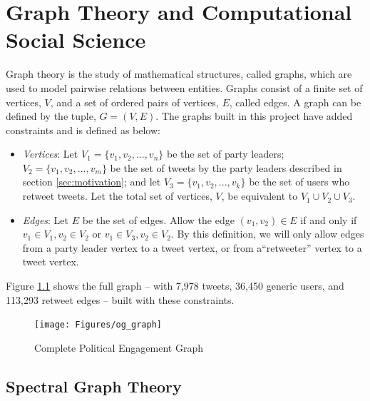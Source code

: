 \chapter{Graph Theory and Computational Social Science}\label{ch:GraphTheory}

Graph theory is the study of mathematical structures, called graphs, which are
used to model pairwise relations between entities. Graphs consist of a finite
set of vertices, $V$, and a set of ordered pairs of vertices, $E$, called edges.
A graph can be defined by the tuple, $G=(V,E)$. The graphs built in this project
have added constraints and is defined as below:

\begin{itemize}
    \item \emph{Vertices}: Let $V_{1}=\{v_{1},v_{2},...,v_{n}\}$ be the set of
    party leaders; $V_{2}=\{v_{1},v_{2},...,v_{m}\}$ be the set of tweets by the
    party leaders described in section \ref{sec:motivation}; and let
    $V_{3}=\{v_{1},v_{2},...,v_{k}\}$ be the set of users who retweet tweets.
    Let the total set of vertices, $V$, be equivalent to $V_{1}\cup V_{2}\cup
    V_{3}$.    
    \item \emph{Edges}: Let $E$ be the set of edges. Allow the edge $(v_{1},
    v_{2})\in E$ if and only if $v_{1}\in V_{1}, v_{2}\in V_{2}$ or $v_{1}\in
    V_{3}, v_{2}\in V_{2}$. By this definition, we will only allow edges from a
    party leader vertex to a tweet vertex, or from a“retweeter” vertex to a
    tweet vertex.
\end{itemize}

Figure \ref{fig:og_graph} shows the full graph -- with 7,978 tweets, 36,450 generic users,
and 113,293 retweet edges --  built with these constraints.

\begin{singlespacing}
    \begin{figure}[H]
    \centering
    \texttt{[image: Figures/og\_graph]}
    \caption[Complete Political Engagement Graph]{Complete Political Engagement Graph}
    \label{fig:og_graph}
    \end{figure}
\end{singlespacing}

\section{Spectral Graph Theory}\label{sec:spectralGraphTheory}

